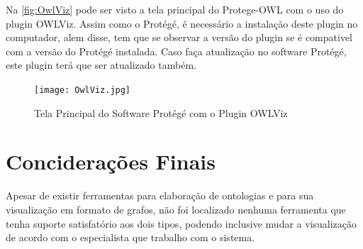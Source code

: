 Na \autoref{fig:OwlViz} pode ser visto a tela principal do Protege-OWL com o uso do plugin OWLViz. Assim como o Protégé, é necessário a instalação deste plugin no computador, alem disse, tem que se observar a versão do plugin se é compativel com a versão do Protégé instalada. Caso faça atualização no software Protégé, este plugin terá que ser atualizado também.

\begin{figure}[h]
    \centering
    \texttt{[image: OwlViz.jpg]}
    \caption{Tela Principal do Software Protégé com o Plugin OWLViz}
    \label{fig:OwlViz}
\end{figure}


\section{Conciderações Finais}

Apesar de existir ferramentas para elaboração de ontologias e para sua visualização em formato de grafos, não foi localizado nenhuma ferramenta que tenha suporte satisfatório aos dois tipos, podendo inclusive mudar a visualização de acordo com o especialista que trabalho com o sistema.